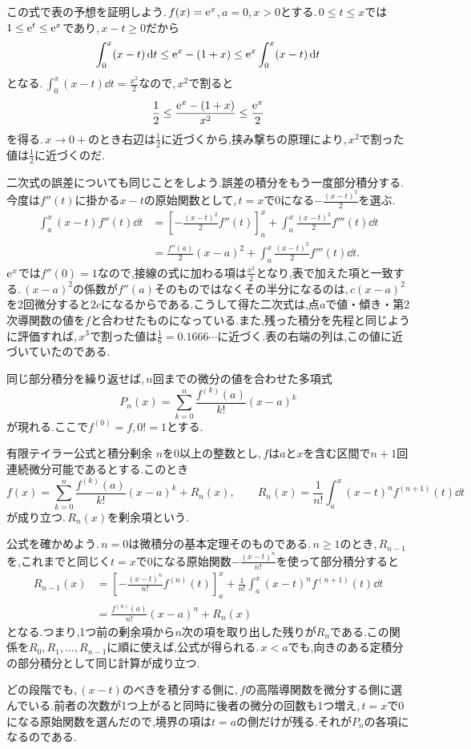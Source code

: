 この式で表の予想を証明しよう.\,$f(x)=\mathrm{e}^x$,\,$a=0$,\,$x>0$とする.\,$0\le t\le x$では$1\le\mathrm{e}^t\le\mathrm{e}^x$であり,\,$x-t\ge0$だから
\[
 \int_0^x(x-t)\,\mathrm{d} t
 \le\mathrm{e}^x-(1+x)
 \le\mathrm{e}^x\int_0^x(x-t)\,\mathrm{d} t
\]
となる.\,$\int_0^x(x-t)\dd t=\frac{x^2}{2}$なので,\,$x^2$で割ると
\[
 \frac12\le\frac{\mathrm{e}^x-(1+x)}{x^2}\le\frac{\mathrm{e}^x}{2}
\]
を得る.\,$x\to0+$のとき右辺は$\frac12$に近づくから,挟み撃ちの原理により,\,$x^2$で割った値は$\frac12$に近づくのだ.

二次式の誤差についても同じことをしよう.誤差の積分をもう一度部分積分する.今度は$f''(t)$に掛かる$x-t$の原始関数として,\,$t=x$で$0$になる$-\frac{(x-t)^2}{2}$を選ぶ.
\begin{align*}
 \int_a^x(x-t)f''(t)\dd t
 &=\left[-\frac{(x-t)^2}{2}f''(t)\right]_a^x+\int_a^x\frac{(x-t)^2}{2}f'''(t)\dd t\\
 &=\frac{f''(a)}{2}(x-a)^2+\int_a^x\frac{(x-t)^2}{2}f'''(t)\dd t.
\end{align*}
$\mathrm{e}^x$では$f''(0)=1$なので,接線の式に加わる項は$\frac{x^2}{2}$となり,表で加えた項と一致する.\,$(x-a)^2$の係数が$f''(a)$そのものではなくその半分になるのは,\,$c(x-a)^2$を2回微分すると$2c$になるからである.こうして得た二次式は,点$a$で値・傾き・第2次導関数の値を$f$と合わせたものになっている.また,残った積分を先程と同じように評価すれば,\,$x^3$で割った値は$\frac16=0.1666\cdots$に近づく.表の右端の列は,この値に近づいていたのである.

同じ部分積分を繰り返せば,\,$n$回までの微分の値を合わせた多項式
\[
 P_n(x)=\sum_{k=0}^{n}\frac{f^{(k)}(a)}{k!}(x-a)^k
\]
が現れる.ここで$f^{(0)}=f$,\,$0!=1$とする.

\begin{theorem}{有限テイラー公式と積分剰余}
$n$を$0$以上の整数とし,\,$f$は$a$と$x$を含む区間で$n+1$回連続微分可能であるとする.このとき
\[
 f(x)=\sum_{k=0}^{n}\frac{f^{(k)}(a)}{k!}(x-a)^k+R_n(x),
 \qquad
 R_n(x)=\frac{1}{n!}\int_a^x(x-t)^n f^{(n+1)}(t)\dd t
\]
が成り立つ.\,$R_n(x)$を剰余項という.
\end{theorem}

公式を確かめよう.\,$n=0$は微積分の基本定理そのものである.\,$n\ge1$のとき,\,$R_{n-1}$を,これまでと同じく$t=x$で$0$になる原始関数$-\frac{(x-t)^n}{n!}$を使って部分積分すると
\begin{align*}
 R_{n-1}(x)
 &=\left[-\frac{(x-t)^n}{n!}f^{(n)}(t)\right]_a^x
   +\frac{1}{n!}\int_a^x(x-t)^nf^{(n+1)}(t)\dd t\\
 &=\frac{f^{(n)}(a)}{n!}(x-a)^n+R_n(x)
\end{align*}
となる.つまり,1つ前の剰余項から$n$次の項を取り出した残りが$R_n$である.この関係を$R_0,R_1,\ldots,R_{n-1}$に順に使えば,公式が得られる.\,$x<a$でも,向きのある定積分の部分積分として同じ計算が成り立つ.

どの段階でも,\,$(x-t)$のべきを積分する側に,\,$f$の高階導関数を微分する側に選んでいる.前者の次数が1つ上がると同時に後者の微分の回数も1つ増え,\,$t=x$で$0$になる原始関数を選んだので,境界の項は$t=a$の側だけが残る.それが$P_n$の各項になるのである.
